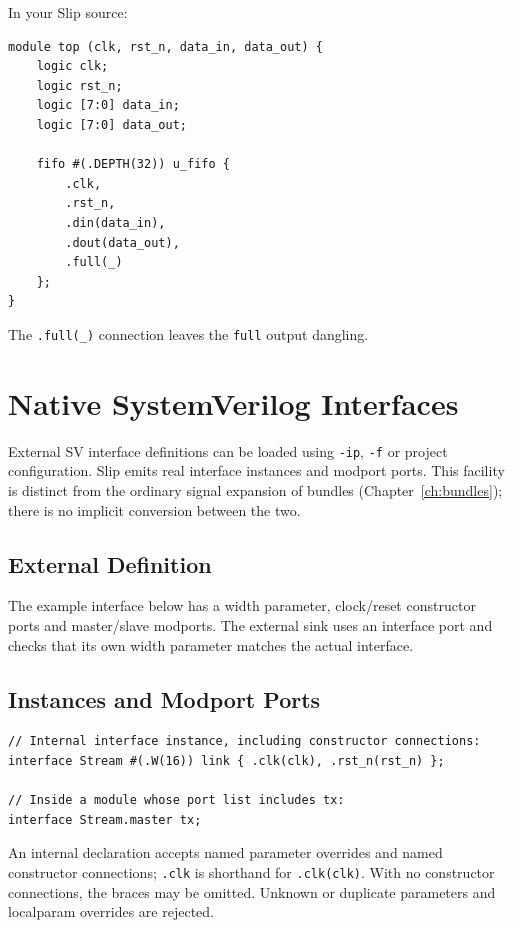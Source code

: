 \documentclass[lang=en,11pt]{elegantbook}
\newcommand{\code}[1]{\texttt{#1}}
\begin{document}
In your Slip source:

\begin{lstlisting}[language=Slip]
module top (clk, rst_n, data_in, data_out) {
    logic clk;
    logic rst_n;
    logic [7:0] data_in;
    logic [7:0] data_out;

    fifo #(.DEPTH(32)) u_fifo {
        .clk,
        .rst_n,
        .din(data_in),
        .dout(data_out),
        .full(_)
    };
}
\end{lstlisting}

The \code{.full(\_)} connection leaves the \code{full} output dangling.

\chapter{Native SystemVerilog Interfaces}
\label{ch:native-interfaces}

External SV interface definitions can be loaded using \code{-ip}, \code{-f} or
project configuration. Slip emits real interface instances and modport ports.
This facility is distinct from the ordinary signal expansion of bundles
(Chapter~\ref{ch:bundles}); there is no implicit conversion between the two.

\section{External Definition}

The example interface below has a width parameter, clock/reset constructor
ports and master/slave modports. The external sink uses an interface port and
checks that its own width parameter matches the actual interface.



\section{Instances and Modport Ports}

\begin{lstlisting}[language=Slip]
// Internal interface instance, including constructor connections:
interface Stream #(.W(16)) link { .clk(clk), .rst_n(rst_n) };

// Inside a module whose port list includes tx:
interface Stream.master tx;
\end{lstlisting}

An internal declaration accepts named parameter overrides and named constructor
connections; \code{.clk} is shorthand for \code{.clk(clk)}. With no constructor
connections, the braces may be omitted. Unknown or duplicate parameters and
localparam overrides are rejected.
\end{document}
